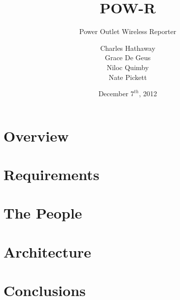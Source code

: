 \documentclass[compress]{beamer}
\title{POW-R}
\subtitle{Power Outlet Wireless Reporter}
\author[]{Charles Hathaway\\Grace De Geus\\Niloc Quimby\\Nate Pickett}
\date{December $7^{th}$, 2012}
\begin{document}
\frame{
    \titlepage
}


\section{Overview}


\section{Requirements}


\section{The People}






\section{Architecture}







\section{Conclusions}


\end{document}
